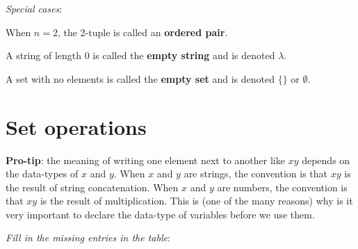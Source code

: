 \documentclass[12pt, oneside]{article}
\begin{document}
{\it Special cases}: 

When $n=2$, the 2-tuple is called an {\bf ordered pair}.

A string of length $0$ is called the {\bf empty string} and is denoted $\lambda$.

A set with no elements is called the {\bf empty set} and is denoted $\{\}$ or $\emptyset$. \vfill
\section*{Set operations}



{\bf Pro-tip}: the meaning of writing one element next to another like $xy$ depends on the data-types of $x$ and 
$y$. When $x$ and $y$ are strings, the convention is that $xy$ is the result of string concatenation. 
When $x$ and $y$ are numbers, the convention is that $xy$ is the result of multiplication. This is 
(one of the many reasons) why is it very important to declare the data-type of variables before we use them.

{\it Fill in the missing entries in the table}:
\end{document}
